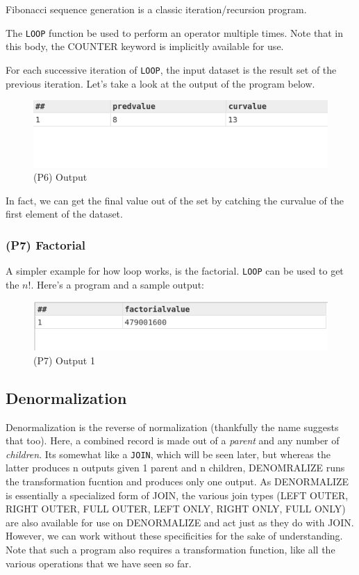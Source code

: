 \noindent{}Fibonacci sequence generation is a classic iteration/recursion program.


The \lstinline!LOOP! function be used to perform an operator multiple times. Note that in this body, the COUNTER keyword is implicitly available for use.

For each successive iteration of \lstinline{LOOP}, the input dataset is the result set of the previous iteration. Let's take a look at the output of the program below.

\begin{figure}[h]
    \centering
    \includegraphics[width=.6\linewidth]{../output/43/op.png}
    \caption{(P6) Output}
\end{figure}

In fact, we can get the final value out of the set by catching the curvalue of the first element of the dataset.

\subsubsection{(P7) Factorial}

A simpler example for how loop works, is the factorial. \lstinline!LOOP! can be used to get the $n!$.
Here's a program and a sample output:



\begin{figure}[h]
    \centering
    \includegraphics[width=.6\linewidth]{../output/44/1.png}
    \caption{(P7) Output 1}
\end{figure}


\subsection{Denormalization}

Denormalization is the reverse of normalization (thankfully the name suggests that too). Here, a combined record is made out of a \textit{parent} and any number of \textit{children}. Its somewhat like a \lstinline{JOIN}, which will be seen later, but whereas the latter produces n outputs given 1 parent and n children, DENOMRALIZE runs the transformation fucntion and produces only one output. As DENORMALIZE is essentially a specialized form of JOIN, the various join types (LEFT OUTER, RIGHT OUTER, FULL OUTER, LEFT ONLY, RIGHT ONLY, FULL ONLY) are also available for use on DENORMALIZE and act just as they do with JOIN. However, we can work without these specificities for the sake of understanding. Note that such a program also requires a transformation function, like all the various operations that we have seen so far.

